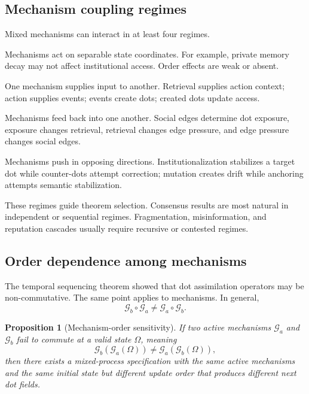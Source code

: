 \documentclass[11pt]{article}
\newtheorem{proposition}{Proposition}
\theoremstyle{remark}
\begin{document}
\subsection{Mechanism coupling regimes}\label{mechanism-coupling-regimes}

Mixed mechanisms can interact in at least four regimes.

\begin{description}[leftmargin=3.8cm,style=nextline]
\item[Independent regime]
Mechanisms act on separable state coordinates. For example, private memory decay may not affect institutional access. Order effects are weak or absent.

\item[Sequential regime]
One mechanism supplies input to another. Retrieval supplies action context; action supplies events; events create dots; created dots update access.

\item[Recursive regime]
Mechanisms feed back into one another. Social edges determine dot exposure, exposure changes retrieval, retrieval changes edge pressure, and edge pressure changes social edges.

\item[Adversarial or contested regime]
Mechanisms push in opposing directions. Institutionalization stabilizes a target dot while counter-dots attempt correction; mutation creates drift while anchoring attempts semantic stabilization.
\end{description}

These regimes guide theorem selection. Consensus results are most natural in independent or sequential regimes. Fragmentation, misinformation, and reputation cascades usually require recursive or contested regimes.

\subsection{Order dependence among mechanisms}\label{mechanism-order-dependence}

The temporal sequencing theorem showed that dot assimilation operators may be non-commutative. The same point applies to mechanisms. In general,
\[
\mathscr G_b\circ\mathscr G_a\neq \mathscr G_a\circ\mathscr G_b.
\]

\begin{proposition}[Mechanism-order sensitivity]
If two active mechanisms \(\mathscr G_a\) and \(\mathscr G_b\) fail to commute at a valid state \(\Omega\), meaning
\[
\mathscr G_b(\mathscr G_a(\Omega))\neq \mathscr G_a(\mathscr G_b(\Omega)),
\]
then there exists a mixed-process specification with the same active mechanisms and the same initial state but different update order that produces different next dot fields.
\end{proposition}
\end{document}
